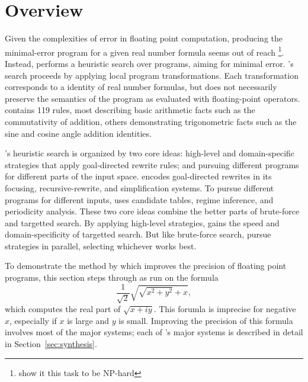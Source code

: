 \documentclass[paper.tex]{subfiles}
\begin{document}
\section{Overview}
\label{sec:overview}

Given the complexities of error in floating point computation,
  producing the minimal-error program
  for a given real number formula
  seems out of reach%
  \footnote{\cite{} show it this task to be NP-hard}.
Instead, \casio performs a heuristic search over programs,
  aiming for minimal error.
\casio's search proceeds by applying local program transformations.
Each transformation corresponds to a identity of real number formulas,
  but does not necessarily preserve the semantics of the program
  as evaluated with floating-point operators.
\casio contains 119 rules,
  most describing basic arithmetic facts
  such as the commutativity of addition,
  others demonstrating trigonometric facts
  such as the sine and cosine angle addition identities.

\casio's heuristic search is organized by two core ideas:
  high-level and domain-specific strategies
  that apply goal-directed rewrite rules;
  and pursuing different programs
  for different parts of the input space.
\casio encodes goal-directed rewrites in its
  focusing, recursive-rewrite, and simplification systems.
To pursue different programs for different inputs, \casio uses
  candidate tables, regime inference, and periodicity analysis.
These two core ideas combine the better parts
  of brute-force and targetted search.
By applying high-level strategies,
  \casio gains the speed and domain-specificity of targetted search.
But like brute-force search,
  \casio pursue strategies in parallel, selecting whichever works best.

To demonstrate the method by which
  \casio improves the precision of floating point programs,
  this section steps through \casio as run on the formula
\begin{equation}\label{eq:ex}
  \frac1{\sqrt2} \sqrt{\sqrt{x^2 + y^2} + x},
\end{equation}
  which computes the real part of $\sqrt{x + i y}$.
This forumla is imprecise for negative $x$,
  especially if $x$ is large and $y$ is small.
Improving the precision of this formula
  involves most of the major systems;
  each of \casio's major systems is described in detail
  in Section~\ref{sec:synthesis}.
\end{document}
